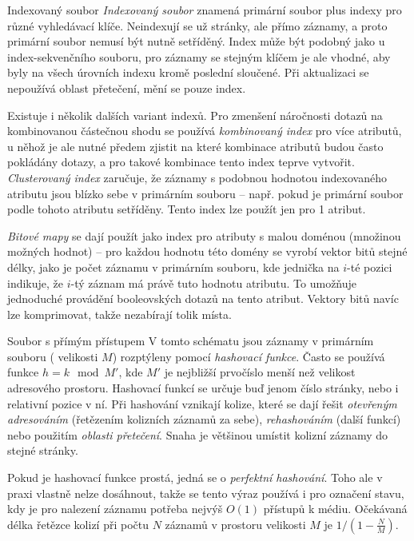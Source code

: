 \begin{obecne}{Indexovaný soubor}
\emph{Indexovaný soubor} znamená primární soubor plus indexy pro různé vyhledávací klíče. Neindexují se už stránky, ale přímo záznamy, a proto primární soubor nemusí být nutně setříděný. Index může být podobný jako u index-sekvenčního souboru, pro záznamy se stejným klíčem je ale vhodné, aby byly na všech úrovních indexu kromě poslední sloučené. Při aktualizaci se nepoužívá oblast přetečení, mění se pouze index.

Existuje i několik dalších variant indexů. Pro zmenšení náročnosti dotazů na kombinovanou částečnou shodu se používá \emph{kombinovaný index} pro více atributů, u něhož je ale nutné předem zjistit na které kombinace atributů budou často pokládány dotazy, a pro takové kombinace tento index teprve vytvořit. \emph{Clusterovaný index} zaručuje, že záznamy s podobnou hodnotou indexovaného atributu jsou blízko sebe v primárním souboru -- např. pokud je primární soubor podle tohoto atributu setříděny. Tento index lze použít jen pro 1 atribut. 

\emph{Bitové mapy} se dají použít jako index pro atributy s malou doménou (množinou možných hodnot) -- pro každou hodnotu této domény se vyrobí vektor bitů stejné délky, jako je počet záznamu v primárním souboru, kde jednička na $i$-té pozici indikuje, že $i$-tý záznam má právě tuto hodnotu atributu. To umožňuje jednoduché provádění booleovských dotazů na tento atribut. Vektory bitů navíc lze komprimovat, takže nezabírají tolik místa.
\end{obecne}

\begin{obecne}{Soubor s přímým přístupem}
V tomto schématu jsou záznamy v primárním souboru ( velikosti $M$) rozptýleny pomocí \emph{hashovací funkce}. Často se používá funkce $h=k\mod M'$, kde $M'$ je nejbližší prvočíslo menší než velikost adresového prostoru. Hashovací funkcí se určuje buď jenom číslo stránky, nebo i relativní pozice v ní. Při hashování vznikají kolize, které se dají řešit \emph{otevřeným adresováním} (řetězením kolizních záznamů za sebe), \emph{rehashováním} (další funkcí) nebo použitím \emph{oblasti přetečení}. Snaha je většinou umístit kolizní záznamy do stejné stránky. 

Pokud je hashovací funkce prostá, jedná se o \emph{perfektní hashování}. Toho ale v praxi vlastně nelze dosáhnout, takže se tento výraz používá i pro označení stavu, kdy je pro nalezení záznamu potřeba nejvýš $O(1)$ přístupů k médiu. Očekávaná délka řetězce kolizí při počtu $N$ záznamů v prostoru velikosti $M$ je $1/(1-\frac{N}{M})$.
\end{obecne}

